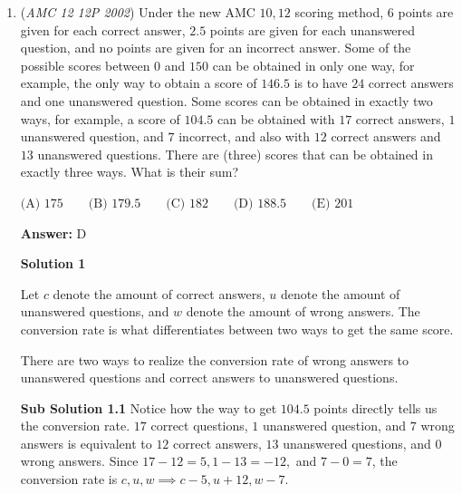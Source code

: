 \begin{enumerate}
We may rewrite the given equation as 
 \[2 \left(\frac {\log c}{\log a} + \frac {\log c}{\log b} \right) = \frac {9\log c}{\log a + \log b}\]Since $c \neq 1$, we have $\log c \neq 0$, so we may divide by $\log c$ on both sides. After making the substitutions $x = \log a$ and $y = \log b$, our equation becomes 
 \[\frac {2}{x} + \frac {2}{y} = \frac {9}{x+y}\]

 Rewriting the left-hand side gives 
 \[\frac {2(x+y)}{xy} = \frac {9}{x+y}\]

 Cross-multiplying gives $2(x+y)^2 = 9xy$ or 
 \[2x^2 - 5xy + 2y^2 = 0\]

 Factoring gives $(2x-y)(x-2y) = 0$ or $\frac {x}{y} = 2, \frac {1}{2}$.

 Recall that $\frac {x}{y} = \frac {\log a}{\log b} = \log_{a} b$. Therefore, the maximum value of $\log_{a} b$ is $\boxed {\text{(C) }2}$.

 


	\item (\textit{AMC 12 12P 2002}) Under the new AMC $10, 12$ scoring method, $6$ points are given for each correct answer, $2.5$ points are given for each unanswered question, and no points are given for an incorrect answer. Some of the possible scores between $0$ and $150$ can be obtained in only one way, for example, the only way to obtain a score of $146.5$ is to have $24$ correct answers and one unanswered question. Some scores can be obtained in exactly two ways, for example, a score of $104.5$ can be obtained with $17$ correct answers, $1$ unanswered question, and $7$ incorrect, and also with $12$ correct answers and $13$ unanswered questions. There are (three) scores that can be obtained in exactly three ways. What is their sum?


 $\text{(A) }175 \qquad \text{(B) }179.5 \qquad \text{(C) }182 \qquad \text{(D) }188.5 \qquad \text{(E) }201$

 \textbf{Answer: }D



\textbf{Solution 1}

Let $c$ denote the amount of correct answers, $u$ denote the amount of unanswered questions, and $w$ denote the amount of wrong answers. The conversion rate is what differentiates between two ways to get the same score.

 There are two ways to realize the conversion rate of wrong answers to unanswered questions and correct answers to unanswered questions.

 \textbf{Sub Solution 1.1} Notice how the way to get $104.5$ points directly tells us the conversion rate. $17$ correct questions, $1$ unanswered question, and $7$ wrong answers is equivalent to $12$ correct answers, $13$ unanswered questions, and $0$ wrong answers. Since $17-12=5, 1-13=-12,$ and $7-0=7$, the conversion rate is $c, u, w \implies c-5, u+12, w-7.$


\end{enumerate}
